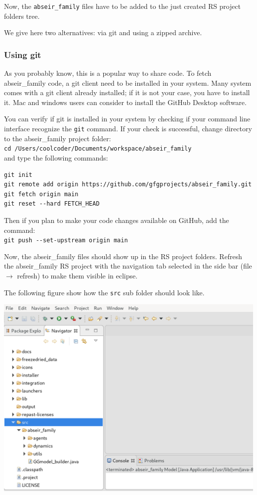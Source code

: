 \documentclass{article}
\begin{document}
\vskip2mm
Now, the \verb+abseir_family+ files have to be added to the just created RS project folders tree.

We give here two alternatives: via git and using a zipped archive.

\subsubsection{Using git}

As you probably know, this is a popular way to share code. 
To fetch abseir\_family code, a git client need to be installed in your system. Many system comes with a git client already installed; if it is not your case, you have to install it. Mac and windows users can consider to install the GitHub Desktop software.

You can verify if git is installed in your system by checking if your command line interface recognize the \verb+git+ command.  
If your check is successful, change directory to the abseir\_family project folder:\\
\verb+cd /Users/coolcoder/Documents/workspace/abseir_family+\\
and type the following commands:
\begin{verbatim}
git init
git remote add origin https://github.com/gfgprojects/abseir_family.git
git fetch origin main
git reset --hard FETCH_HEAD
\end{verbatim}

Then if you plan to make your code changes available on GitHub, add the command:\\
\verb+git push --set-upstream origin main+

Now, the abseir\_family files should show up in the RS project folders.
Refresh the abseir\_family RS project with the navigation tab selected in the side bar (file $\rightarrow$ refresh) to make them visible in eclipse.

The following figure show how the \verb+src+ sub folder should look like.

\vskip2mm
\noindent
\includegraphics[scale=0.2]{fig_abseir_rs_navigation1}
\end{document}

